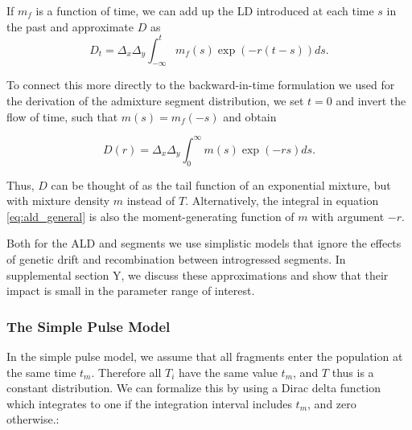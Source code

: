 \documentclass[11pt]{article}
\begin{document}
If $m_f$ is a function of time, we can add up the LD introduced at each time $s$ in the past and approximate $D$ as 
\begin{equation}
    D_t = \Delta_x\Delta_y\int_{-\infty}^t m_f(s)\exp(-r(t-s)) ds \text{.} \label{eq:ld_general_bwd}
\end{equation}

To connect this more directly to the backward-in-time formulation we used for the derivation of the admixture segment distribution, we set $t=0$ and invert the flow of time, such that $m(s) = m_f(-s)$ and obtain

\begin{equation}
    D(r) = \Delta_x\Delta_y\int_0^{\infty} m(s)\exp(-rs) ds \text{.} \label{eq:ld_general}
\end{equation}

Thus, $D$ can be thought of as the tail function of an exponential mixture, but with mixture density $m$ instead of $T$. Alternatively, the integral in equation \ref{eq:ald_general} is also the moment-generating function of $m$ with argument $-r$. 

Both for the ALD and segments we use simplistic models that ignore the effects of genetic drift and recombination between introgressed segments. In supplemental section Y, we discuss these approximations and show that their impact is small in the parameter range of interest.




\subsubsection{The Simple Pulse Model}\label{The Simple Pulse Model}
	
	
In the simple pulse model, we assume that all fragments enter the population at the same time $t_m$. Therefore all $T_i$ have the same value $t_m$, and $T$ thus is a constant distribution. We can formalize this by using a Dirac delta function which integrates to one if the integration interval includes $t_m$, and zero otherwise.:
\end{document}
